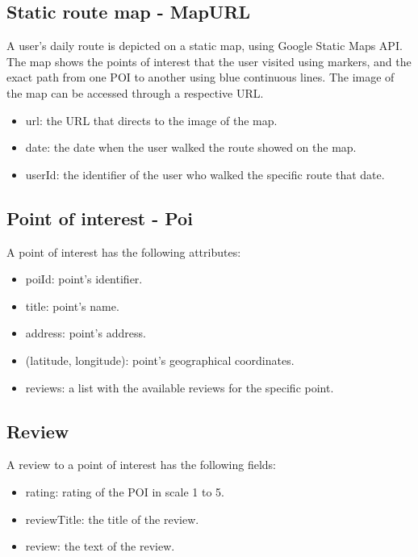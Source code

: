 \subsection{Static route map - MapURL}

A user's daily route is depicted on a static map, using Google Static Maps API. The map shows the points of interest that the user visited using markers, 
and the exact path from one POI to another using blue continuous lines. The image of the map can be accessed through a respective URL.

\begin{itemize}
 \item url: the URL that directs to the image of the map.
 \item date: the date when the user walked the route showed on the map.
 \item userId: the identifier of the user who walked the specific route that date.
\end{itemize}

\subsection{Point of interest - Poi}

A point of interest has the following attributes:

\begin{itemize}
 \item poiId: point's identifier.
 \item title: point's name.
 \item address: point's address.
 \item (latitude, longitude): point's geographical coordinates.
 \item reviews: a list with the available reviews for the specific point.
\end{itemize}

\subsection{Review}

A review to a point of interest has the following fields:

\begin{itemize}
 \item rating: rating of the POI in scale 1 to 5.
 \item reviewTitle: the title of the review.
 \item review: the text of the review.
\end{itemize}

